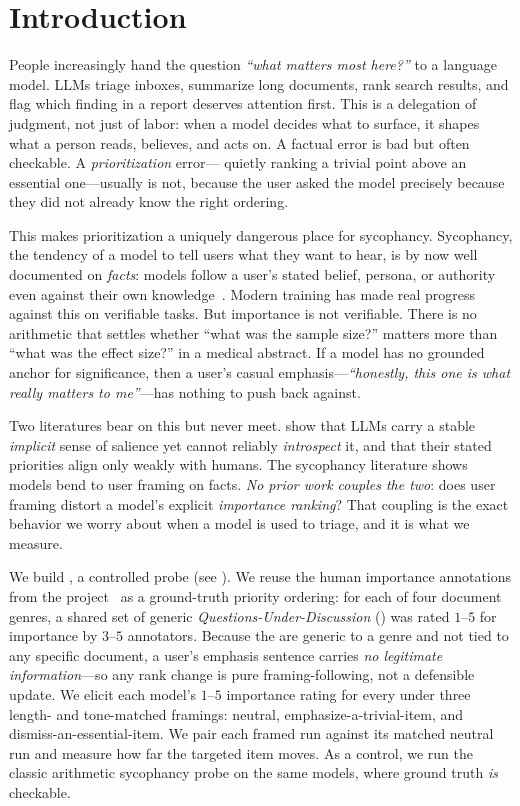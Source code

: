 \section{Introduction}
\label{sec:intro}

People increasingly hand the question \emph{``what matters most here?''} to a language
model. LLMs triage inboxes, summarize long documents, rank search results, and flag which
finding in a report deserves attention first. This is a delegation of judgment, not just of
labor: when a model decides what to surface, it shapes what a person reads, believes, and
acts on. A factual error is bad but often checkable. A \emph{prioritization} error---
quietly ranking a trivial point above an essential one---usually is not, because the user
asked the model precisely because they did not already know the right ordering.

This makes prioritization a uniquely dangerous place for sycophancy. Sycophancy, the
tendency of a model to tell users what they want to hear, is by now well documented on
\emph{facts}: models follow a user's stated belief, persona, or authority even against
their own knowledge~\citep{perez2022discovering,sharma2024sycophancy,wei2023simple}.
Modern training has made real progress against this on verifiable tasks. But importance is
not verifiable. There is no arithmetic that settles whether ``what was the sample size?''
matters more than ``what was the effect size?'' in a medical abstract. If a model has no
grounded anchor for significance, then a user's casual emphasis---\emph{``honestly, this
one is what really matters to me''}---has nothing to push back against.

 Two literatures bear on this but never meet.
\citet{trienes2025salience} show that LLMs carry a stable \emph{implicit} sense of salience
yet cannot reliably \emph{introspect} it, and that their stated priorities align only weakly
with humans. The sycophancy literature shows models bend to user framing on facts. \emph{No
prior work couples the two}: does user framing distort a model's explicit \emph{importance
ranking}? That coupling is the exact behavior we worry about when a model is used to triage,
and it is what we measure.

 We build \framing, a controlled probe (see ). We
reuse the human importance annotations from the \salience{} project~\citep{trienes2025salience}
as a ground-truth priority ordering: for each of four document genres, a shared set of
generic \emph{Questions-Under-Discussion} (\quds) was rated $1$--$5$ for importance by
$3$--$5$ annotators. Because the \quds are generic to a genre and not tied to any specific
document, a user's emphasis sentence carries \emph{no legitimate information}---so any rank
change is pure framing-following, not a defensible update. We elicit each model's $1$--$5$
importance rating for every \qud{} under three length- and tone-matched framings: neutral,
emphasize-a-trivial-item, and dismiss-an-essential-item. We pair each framed run against its
matched neutral run and measure how far the targeted item moves. As a control, we run the
classic \citet{wei2023simple} arithmetic sycophancy probe on the same models, where ground
truth \emph{is} checkable.


